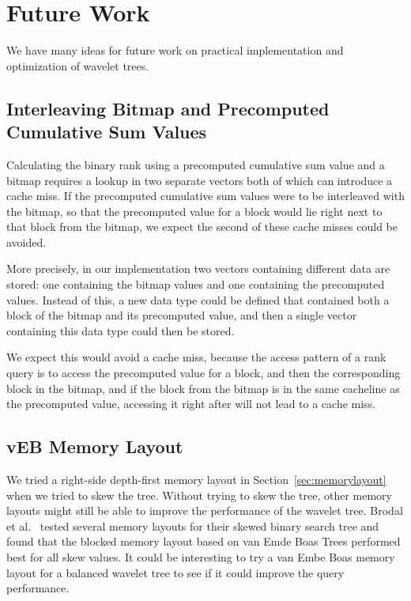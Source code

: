 \section{Future Work}
We have many ideas for future work on practical implementation and optimization of wavelet trees.

\subsection{Interleaving Bitmap and Precomputed Cumulative Sum Values}
Calculating the binary rank using a precomputed cumulative sum value and a bitmap requires a lookup in two separate vectors both of which can introduce a cache miss.
If the precomputed cumulative sum values were to be interleaved with the bitmap, so that the precomputed value for a block would lie right next to that block from the bitmap, we expect the second of these cache misses could be avoided.

More precisely, in our implementation two vectors containing different data are stored: one containing the bitmap values and one containing the precomputed values.
Instead of this, a new data type could be defined that contained both a block of the bitmap and its precomputed value, and then a single vector containing this data type could then be stored.

We expect this would avoid a cache miss, because the access pattern of a rank query is to access the precomputed value for a block, and then the corresponding block in the bitmap, and if the block from the bitmap is in the same cacheline as the precomputed value, accessing it right after will not lead to a cache miss.

\subsection{vEB Memory Layout}
\label{sec:futurework_vebmemorylayout}
We tried a right-side depth-first memory layout in Section~\ref{sec:memorylayout} when we tried to skew the tree.
Without trying to skew the tree, other memory layouts might still be able to improve the performance of the wavelet tree.
Brodal et al.~ tested several memory layouts for their skewed binary search tree and found that the blocked memory layout based on van Emde Boas Trees performed best for all skew values.
It could be interesting to try a van Embe Boas memory layout for a balanced wavelet tree to see if it could improve the query performance.

